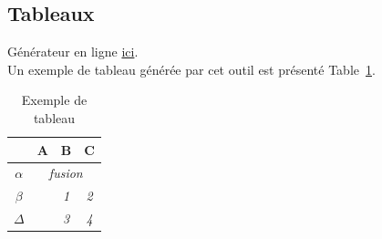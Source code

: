 \FloatBarrier
\subsection{Tableaux}

Générateur en ligne \href{http://www.tablesgenerator.com/latex_tables}{ici}. \\

Un exemple de tableau générée par cet outil est présenté Table~\ref{tableau_exemple}.

\begin{table}[]
\centering
\begin{tabular}{c|c|c|c|}
\cline{2-4}
                               & \textbf{A}                 & \textbf{B} & \textbf{C} \\ \hline
\multicolumn{1}{|c|}{$\alpha$} & \multicolumn{3}{c|}{\textit{fusion}}                 \\ \hline
\multicolumn{1}{|c|}{$\beta$}  & \multirow{2}{*}{\textit{}} & \textit{1} & \textit{2} \\ \cline{1-1} \cline{3-4} 
\multicolumn{1}{|c|}{$\Delta$} &                            & \textit{3} & \textit{4} \\ \hline
\end{tabular}
\caption{Exemple de tableau}
\label{tableau_exemple}
\end{table}
